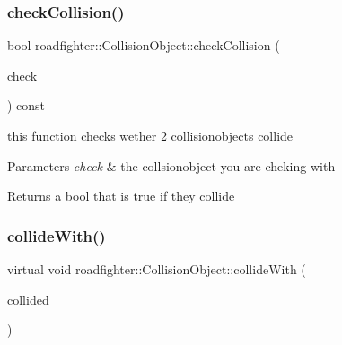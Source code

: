 \mbox{\label{classroadfighter_1_1CollisionObject_a426a06907212c866a22cba7ec84ebe65}} 
\subsubsection{\texorpdfstring{check\+Collision()}{checkCollision()}}
{\footnotesize\ttfamily bool roadfighter\+::\+Collision\+Object\+::check\+Collision (\begin{DoxyParamCaption}\item[{std\+::shared\+\_\+ptr$<$ \hyperlink{classroadfighter_1_1CollisionObject}{Collision\+Object} $>$ \&}]{check }\end{DoxyParamCaption}) const}

this function checks wether 2 collisionobjects collide 
\begin{DoxyParams}{Parameters}
{\em check} & the collsionobject you are cheking with \\
\hline
\end{DoxyParams}
\begin{DoxyReturn}{Returns}
a bool that is true if they collide 
\end{DoxyReturn}
\mbox{\label{classroadfighter_1_1CollisionObject_a7eafa2fdc4463788b816fdd9370d28d9}} 
\subsubsection{\texorpdfstring{collide\+With()}{collideWith()}}
{\footnotesize\ttfamily virtual void roadfighter\+::\+Collision\+Object\+::collide\+With (\begin{DoxyParamCaption}\item[{std\+::shared\+\_\+ptr$<$ \hyperlink{classroadfighter_1_1CollisionObject}{Collision\+Object} $>$ \&}]{collided }\end{DoxyParamCaption})\hspace{0.3cm}{\ttfamily [pure virtual]}}

